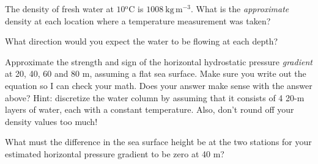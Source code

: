 The density of fresh water at $10\mathrm{^oC}$ is $1008\ \mathrm{kg\,m^{-3}}$.  What is the \emph{approximate} density at each location where a temperature measurement was taken?

What direction would you expect the water to be flowing at each depth?

Approximate the strength and sign of the horizontal hydrostatic pressure \emph{gradient} at 20, 40, 60 and 80 m, assuming a flat sea surface. Make sure you write out the equation so I can check your math. Does your answer make sense with the answer above? Hint: discretize the water column by assuming that it consists of 4 20-m layers of water, each with a constant temperature. Also, don't round off your density values too much!

What must the difference in the sea surface height be at the two stations for your estimated horizontal pressure gradient to be zero at 40 m?

